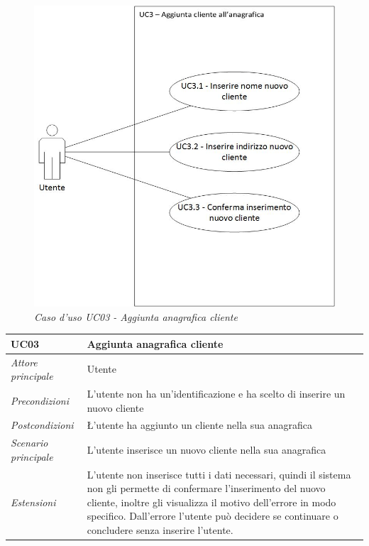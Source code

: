	\begin{figure}[ht]
		\centering
		\includegraphics[scale=0.35]{immagini/analisi/UC03_aggiunta_cliente_anagrafica.jpg}
		\caption{\textit{Caso d'uso UC03 - Aggiunta anagrafica cliente}}
	\end{figure}\FloatBarrier
	
		\begin{center}
			\begin{tabularx}{\textwidth}{p{3cm} p{9.30cm}}
				\hline
				\textbf{UC03} & \textbf{Aggiunta anagrafica cliente} \\
				\hline
				\textit{Attore principale} & Utente \\
				\hline
				\textit{Precondizioni} & L’utente non ha un’identificazione e ha scelto di inserire un nuovo cliente\\
				\hline
				\textit{Postcondizioni} & \L’utente ha aggiunto un cliente nella sua anagrafica\\
				\hline
				\textit{Scenario principale} & L’utente inserisce un nuovo cliente nella sua anagrafica\\
				\hline
				\textit{Estensioni} & L’utente non inserisce tutti i dati necessari, quindi il sistema non gli permette di confermare l’inserimento del nuovo cliente, inoltre gli visualizza il motivo dell’errore in modo specifico. Dall’errore l’utente può decidere se continuare o concludere senza inserire l’utente.\\
				\hline
			\end{tabularx}
		\end{center}
	
